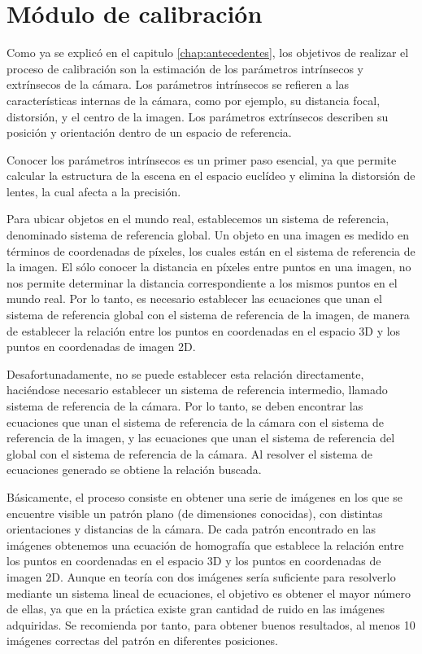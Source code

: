 \section{Módulo de calibración}
Como ya se explicó en el capitulo \ref{chap:antecedentes}, los objetivos de realizar el proceso de calibración son la estimación de los parámetros intrínsecos y extrínsecos de la cámara. Los parámetros intrínsecos se refieren a las características internas de la cámara, como por ejemplo, su distancia focal, distorsión, y el centro de la imagen. Los parámetros extrínsecos describen su posición y orientación dentro de un espacio de referencia. 

Conocer los parámetros intrínsecos es un primer paso esencial, ya que permite calcular la estructura de la escena en el espacio euclídeo y elimina la distorsión de lentes, la cual afecta a la precisión.

Para ubicar objetos en el mundo real, establecemos un sistema de referencia, denominado sistema de referencia global. Un objeto en una imagen es medido en términos de coordenadas de píxeles, los cuales están en el sistema de referencia de la imagen. El sólo conocer la distancia en píxeles entre puntos en una imagen, no nos permite determinar la distancia correspondiente a los mismos puntos en el mundo real. Por lo tanto, es necesario establecer las ecuaciones que unan el sistema de referencia global con el sistema de referencia de la imagen, de manera de establecer la relación entre los puntos en coordenadas en el espacio 3D y los puntos en coordenadas de imagen 2D. 

Desafortunadamente, no se puede establecer esta relación directamente, haciéndose necesario establecer un sistema de referencia intermedio, llamado sistema de referencia de la cámara. Por lo tanto, se deben encontrar las ecuaciones que unan el sistema de referencia de la cámara con el sistema de referencia de la imagen, y las ecuaciones que unan el sistema  de referencia del global con el sistema de referencia de la cámara. Al resolver el sistema de ecuaciones generado se obtiene la relación buscada.

Básicamente, el proceso consiste en obtener una serie de imágenes en los que se encuentre visible un patrón plano (de dimensiones conocidas), con distintas orientaciones y distancias de la cámara. De cada patrón encontrado en las imágenes obtenemos una ecuación de homografía que establece la relación entre los puntos en coordenadas en el espacio 3D y los puntos en coordenadas de imagen 2D. Aunque en teoría con dos imágenes sería suficiente para resolverlo mediante un sistema lineal de ecuaciones, el objetivo es obtener el mayor número de ellas, ya que en la práctica existe gran cantidad de ruido en las imágenes adquiridas. Se recomienda por tanto, para obtener buenos resultados, al menos 10 imágenes correctas del patrón en diferentes posiciones.

